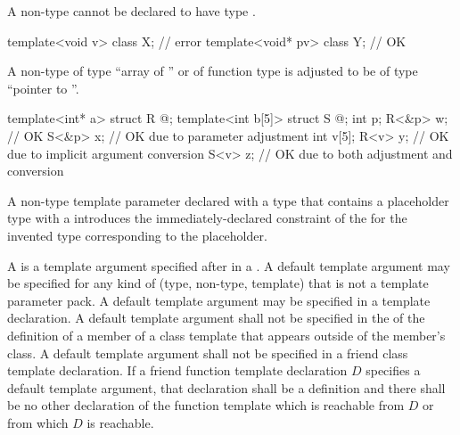 \pnum
\begin{note}
A non-type
cannot be declared to have type \cv{} .
\begin{example}
\begin{codeblock}
template<void v> class X;       // error
template<void* pv> class Y;     // OK
\end{codeblock}
\end{example}
\end{note}

\pnum
A non-type
%
of type ``array of '' or
%
of function type 
is adjusted to be of type ``pointer to ''.
\begin{example}
\begin{codeblock}
template<int* a>   struct R { @\commentellip@ };
template<int b[5]> struct S { @\commentellip@ };
int p;
R<&p> w;                        // OK
S<&p> x;                        // OK due to parameter adjustment
int v[5];
R<v> y;                         // OK due to implicit argument conversion
S<v> z;                         // OK due to both adjustment and conversion
\end{codeblock}
\end{example}

\pnum
A non-type template parameter declared with a type that
contains a placeholder type with a 
introduces the immediately-declared constraint
of the 
for the invented type corresponding to the placeholder.

\pnum
A  is
a template argument  specified after \tcode{=}
in a .
A default template argument may be specified for
any kind of  (type, non-type, template)
that is not a template parameter pack.
A default template argument may be specified in a template declaration.
A default template argument shall not be specified in
the 
of the definition of a member of a class template
that appears outside of the member's class.
A default template argument
shall not be specified in a friend class template declaration.
If a friend function template declaration $D$
specifies a default template argument,
that declaration shall be a definition and
there shall be no other declaration of the function template
which is reachable from $D$ or from which $D$ is reachable.


